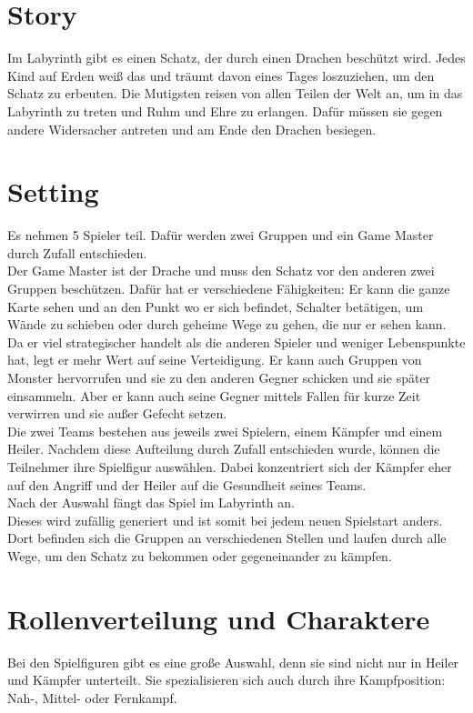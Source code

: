 \documentclass[10pt,a4paper,notitlepage]{report}
\begin{document}
\begin{flushleft}
\section{Story}
Im Labyrinth gibt es einen Schatz, der durch einen Drachen beschützt wird. Jedes Kind auf Erden weiß das und träumt davon eines Tages loszuziehen, um den Schatz zu erbeuten. Die Mutigsten reisen von allen Teilen der Welt an, um in das Labyrinth zu treten und Ruhm und Ehre zu erlangen. Dafür müssen sie gegen andere Widersacher antreten und am Ende den Drachen besiegen.\\
\section{Setting}
Es nehmen 5 Spieler teil. Dafür werden zwei Gruppen und ein Game Master durch Zufall entschieden.\\
Der Game Master ist der Drache und muss den Schatz vor den anderen zwei Gruppen beschützen. Dafür hat er verschiedene Fähigkeiten: Er kann die ganze Karte sehen und an den Punkt wo er sich befindet, Schalter betätigen, um Wände zu schieben oder durch geheime Wege zu gehen, die nur er sehen kann. Da er viel strategischer handelt als die anderen Spieler und weniger Lebenspunkte hat, legt er mehr Wert auf seine Verteidigung. Er kann auch Gruppen von Monster hervorrufen und sie zu den anderen Gegner schicken und sie später einsammeln. Aber er kann auch seine Gegner mittels Fallen für kurze Zeit verwirren und sie außer Gefecht setzen.\\
Die zwei Teams bestehen aus jeweils zwei Spielern, einem Kämpfer und einem Heiler. Nachdem diese Aufteilung durch Zufall entschieden wurde, können die Teilnehmer ihre Spielfigur auswählen. Dabei konzentriert sich der Kämpfer eher auf den Angriff und der Heiler auf die Gesundheit seines Teams.\\
Nach der Auswahl fängt das Spiel im Labyrinth an. \\
Dieses wird zufällig generiert und ist somit bei jedem neuen Spielstart anders. Dort befinden sich die Gruppen an verschiedenen Stellen und laufen durch alle Wege, um den Schatz zu bekommen oder gegeneinander zu kämpfen.\\
\section{Rollenverteilung und Charaktere}
Bei den Spielfiguren gibt es eine große Auswahl, denn sie sind nicht nur in Heiler und Kämpfer unterteilt. Sie spezialisieren sich auch durch ihre Kampfposition: Nah-, Mittel- oder Fernkampf.\\

\end{flushleft}
\end{document}
